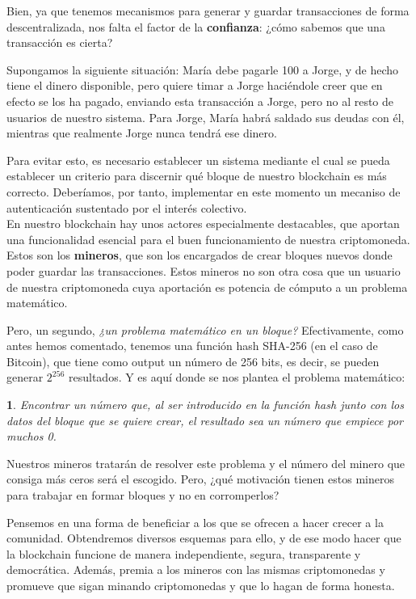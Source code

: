 \documentclass[10pt, a4paper]{article}
\newcommand\dout{\bgroup \markoverwith{\rule[0.2ex]{0.1pt}{0.4pt}\rule[0.8ex]{0.1pt}{0.4pt}}\ULon}
\def\dout{\bgroup
 \markoverwith{\lower-0.35ex\hbox
 {\kern-.03em\vbox{\hrule width.2em\kern0.45ex\hrule}\kern-.03em}}%
 \ULon}
\theoremstyle{theorem-style}
\newtheorem*{datos}{}
\theoremstyle{theorem-style}
\theoremstyle{definition-style}
\theoremstyle{remark-style}
\theoremstyle{example-style}
\theoremstyle{definition-style}
\theoremstyle{remark-style}
\begin{document}
Bien, ya que tenemos mecanismos para generar y guardar transacciones de forma descentralizada, nos falta el factor de la \textbf{confianza}: ¿cómo sabemos que una transacción es cierta?

Supongamos la siguiente situación: María debe pagarle 100\dout{D} a Jorge, y de hecho tiene el dinero disponible, pero quiere timar a Jorge haciéndole creer que en efecto se los ha pagado, enviando esta transacción a Jorge, pero no al resto de usuarios de nuestro sistema. Para Jorge, María habrá saldado sus deudas con él, mientras que realmente Jorge nunca tendrá ese dinero.

Para evitar esto, es necesario establecer un sistema mediante el cual se pueda establecer un criterio para discernir qué bloque de nuestro blockchain es más correcto. Deberíamos, por tanto, implementar en este momento un mecaniso de autenticación sustentado por el interés colectivo.\\

En nuestro blockchain hay unos actores especialmente destacables, que aportan una funcionalidad esencial para el buen funcionamiento de nuestra criptomoneda. Estos son los \textbf{mineros}, que son los encargados de crear bloques nuevos donde poder guardar las transacciones. Estos mineros no son otra cosa que un usuario de nuestra criptomoneda cuya aportación es potencia de cómputo a un problema matemático.

Pero, un segundo, \emph{¿un problema matemático en un bloque?} Efectivamente, como antes hemos comentado, tenemos una función hash SHA-256 (en el caso de Bitcoin), que tiene como output un número de 256 bits, es decir, se pueden generar $2^{256}$ resultados. Y es aquí donde se nos plantea el problema matemático:

\begin{datos}
\hspace{-0.115cm}Encontrar un número que, al ser introducido en la función hash junto con los datos del bloque que se quiere crear, el resultado sea un número que empiece por muchos 0.
\end{datos}

Nuestros mineros tratarán de resolver este problema y el número del minero que consiga más ceros será el escogido. Pero, ¿qué motivación tienen estos mineros para trabajar en formar bloques y no en corromperlos?

Pensemos en una forma de beneficiar a los que se ofrecen a hacer crecer a la comunidad. Obtendremos diversos esquemas para ello, y de ese modo hacer que la blockchain funcione de manera independiente, segura, transparente y democrática. Además, premia a los mineros con las mismas criptomonedas y promueve que sigan minando criptomonedas y que lo hagan de forma honesta.
\end{document}
